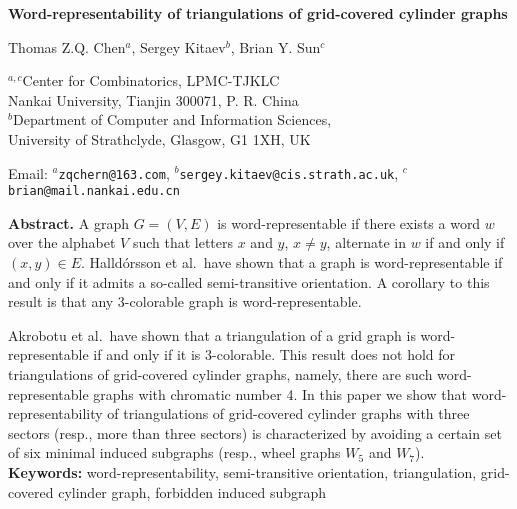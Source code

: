 \documentclass[12pt]{article}
\numberwithin{equation}{section}
\begin{document}
\begin{center}
\textbf{\large{Word-representability of triangulations of grid-covered cylinder graphs}}\textbf{ }
\par\end{center}

\begin{center}
Thomas Z.Q. Chen$^{a}$, Sergey Kitaev$^{b}$, Brian Y. Sun$^{c}$\\[6pt]
\par\end{center}

\begin{center}
$^{a,c}$Center for Combinatorics, LPMC-TJKLC\\
 Nankai University, Tianjin 300071, P. R. China\\
$^{b}$Department of Computer and Information Sciences,\\
 University of Strathclyde, Glasgow, G1 1XH, UK
\par\end{center}

\begin{center}
Email: $^{a}$\texttt{zqchern@163.com}, $^{b}$\texttt{sergey.kitaev@cis.strath.ac.uk},
$^{c}$\texttt{brian@mail.nankai.edu.cn}
\par
\end{center}

\par
\noindent \textbf{Abstract.}
A graph $G=(V,E)$ is word-representable if there exists a word $w$
over the alphabet $V$ such that letters $x$ and $y$, $x\neq y$, alternate in $w$ if and only if $(x,y)\in E$. Halld\'{o}rsson et al.\ have shown that a graph is word-representable if and only if it admits a so-called semi-transitive orientation. A corollary to this result is that any 3-colorable graph is word-representable.

Akrobotu et al.\ have shown that a triangulation of a grid graph is word-representable if and only if it is 3-colorable. This result does not hold for triangulations of grid-covered cylinder graphs, namely, there are such word-representable graphs with chromatic number 4. In this paper we show that word-representability of triangulations of grid-covered cylinder graphs with three sectors (resp., more than three sectors) is characterized by avoiding a certain set of six minimal induced subgraphs (resp., wheel graphs $W_5$ and $W_7$).\\

\noindent \textbf{Keywords:} word-representability, semi-transitive orientation, triangulation, grid-covered cylinder graph, forbidden induced subgraph
\end{document}
